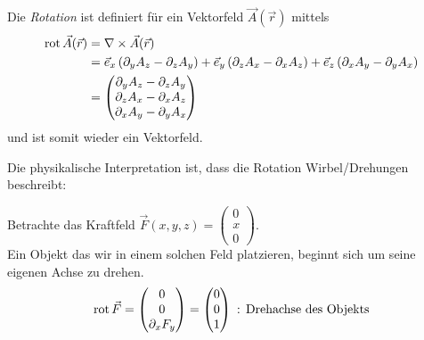 \begin{Definition}[Rotation]
Die {\em Rotation} ist definiert für ein Vektorfeld $\vec{A}(\vec{r})$ mittels
\begin{align*}
\operatorname{rot} \vec{A}(\vec{r}) &= \nabla \times \vec{A}(\vec{r}) \\
&=
\vec{e}_x\left(\partial_y A_z - \partial_z A_y\right) +
\vec{e}_y\left(\partial_z A_x - \partial_x A_z\right) +
\vec{e}_z\left(\partial_x A_y - \partial_y A_x\right) \\
&=
\begin{pmatrix}\partial_y A_z - \partial_z A_y \\ \partial_z A_x -
\partial_x A_z \\ \partial_x A_y - \partial_y A_x\end{pmatrix}
\end{align*}
und ist somit wieder ein Vektorfeld.
\end{Definition}

Die physikalische Interpretation ist, dass die Rotation Wirbel/Drehungen
beschreibt:
\par
Betrachte das Kraftfeld $\vec{F}(x,y,z) =
\begin{pmatrix}0\\x\\0\end{pmatrix}$.\\ 
Ein Objekt das wir in einem solchen Feld platzieren, beginnt sich um seine
eigenen Achse zu drehen.
\begin{align*}
\operatorname{rot} \vec{F} = \begin{pmatrix}0\\0\\ \partial_x F_y\end{pmatrix} =  
\begin{pmatrix}0\\0\\1\end{pmatrix} \text{ : Drehachse des Objekts}
\end{align*}




